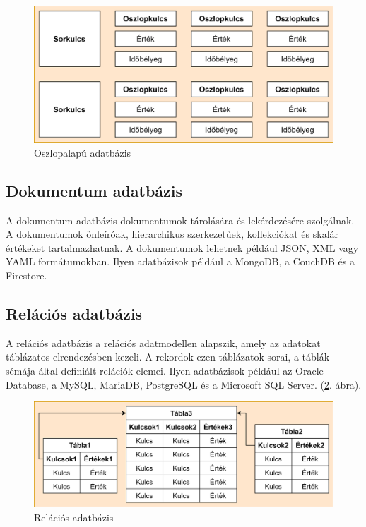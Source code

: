 \begin{figure}[h]
    \centering
    \includegraphics[scale=1]{images/paradigms/column.png}
    \caption{Oszlopalapú adatbázis}
    \label{fig:column}
\end{figure}

\subsection{Dokumentum adatbázis}

A dokumentum adatbázis dokumentumok tárolására és lekérdezésére szolgálnak. A dokumentumok önleíróak, hierarchikus szerkezetűek, kollekciókat és skalár értékeket tartalmazhatnak. A dokumentumok lehetnek például JSON, XML vagy YAML formátumokban. Ilyen adatbázisok például a MongoDB, a CouchDB és a Firestore.

\subsection{Relációs adatbázis}

A relációs adatbázis a relációs adatmodellen alapszik, amely az adatokat táblázatos elrendezésben kezeli. A rekordok ezen táblázatok sorai, a táblák sémája által definiált relációk elemei. Ilyen adatbázisok például az Oracle Database, a MySQL, MariaDB, PostgreSQL és a Microsoft SQL Server. (\ref{fig:relational}. ábra).

\begin{figure}[h]
    \centering
    \includegraphics[scale=0.9]{images/paradigms/relational.png}
    \caption{Relációs adatbázis}
    \label{fig:relational}
\end{figure}

